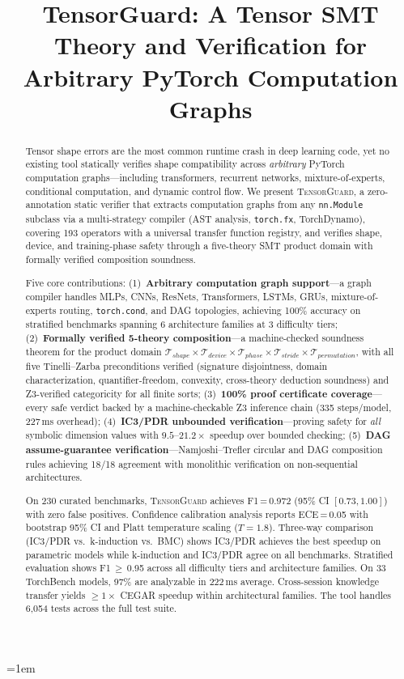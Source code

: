 \documentclass[11pt]{article}
\title{TensorGuard: A Tensor SMT Theory and Verification for Arbitrary PyTorch Computation Graphs}
\date{}
\begin{document}
\emergencystretch=1em

\maketitle

\begin{abstract}
Tensor shape errors are the most common runtime crash in deep learning code,
yet no existing tool statically verifies shape compatibility across
\emph{arbitrary} PyTorch computation graphs---including transformers,
recurrent networks, mixture-of-experts, conditional computation,
and dynamic control flow.
We present \textsc{TensorGuard}, a zero-annotation static verifier
that extracts computation graphs from any \texttt{nn.Module} subclass
via a multi-strategy compiler (AST analysis, \texttt{torch.fx},
TorchDynamo), covering 193 operators with a universal transfer
function registry, and verifies shape, device, and training-phase
safety through a five-theory SMT product domain with formally
verified composition soundness.

Five core contributions:
(1)~\textbf{Arbitrary computation graph support}---a graph compiler
handles MLPs, CNNs, ResNets, Transformers, LSTMs, GRUs,
mixture-of-experts routing, \texttt{torch.cond}, and DAG topologies,
achieving 100\% accuracy on stratified benchmarks spanning 6
architecture families at 3 difficulty tiers;
(2)~\textbf{Formally verified 5-theory composition}---a machine-checked
soundness theorem for the product domain
$\mathcal{T}_{\mathit{shape}} \times \mathcal{T}_{\mathit{device}}
\times \mathcal{T}_{\mathit{phase}} \times \mathcal{T}_{\mathit{stride}}
\times \mathcal{T}_{\mathit{permutation}}$, with all five
Tinelli--Zarba preconditions verified (signature disjointness, domain
characterization, quantifier-freedom, convexity, cross-theory deduction
soundness) and Z3-verified categoricity for all finite sorts;
(3)~\textbf{100\% proof certificate coverage}---every safe verdict
backed by a machine-checkable Z3 inference chain (335 steps/model,
227\,ms overhead);
(4)~\textbf{IC3/PDR unbounded verification}---proving safety for
\emph{all} symbolic dimension values with $9.5$--$21.2\times$ speedup
over bounded checking;
(5)~\textbf{DAG assume-guarantee verification}---Namjoshi--Trefler
circular and DAG composition rules achieving 18/18 agreement with
monolithic verification on non-sequential architectures.

On 230 curated benchmarks, \textsc{TensorGuard} achieves
F1\,=\,0.972 (95\% CI $[0.73, 1.00]$) with zero false positives.
Confidence calibration analysis reports ECE\,=\,0.05 with bootstrap
95\% CI and Platt temperature scaling ($T = 1.8$).
Three-way comparison (IC3/PDR vs.\ k-induction vs.\ BMC) shows
IC3/PDR achieves the best speedup on parametric models while
k-induction and IC3/PDR agree on all benchmarks.
Stratified evaluation shows F1\,$\geq$\,0.95 across all difficulty
tiers and architecture families.
On 33 TorchBench models, 97\% are analyzable in 222\,ms average.
Cross-session knowledge transfer yields $\geq 1\times$ CEGAR speedup
within architectural families.
The tool handles 6,054 tests across the full test suite.
\end{abstract}
\end{document}
